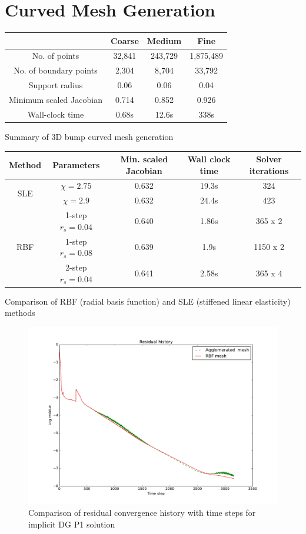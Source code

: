 \documentclass[12pt, letterpaper]{article}
\begin{document}
\section*{Curved Mesh Generation}

	\begin{tabular}{|c|c|c|c|}
		\hline
		& Coarse & Medium & Fine \\
		\hline
		No. of points 				& 32,841 & 243,729	& 1,875,489 \\
		No. of boundary points		& 2,304	& 8,704		& 33,792 \\
		Support radius				& 0.06	& 0.06		& 0.04 \\
		Minimum scaled Jacobian	& 0.714	& 0.852		& 0.926 \\
		Wall-clock time			& 0.68s	& 12.6s		& 338s \\
		\hline
	\end{tabular}
	
	Summary of 3D bump curved mesh generation
	\vspace{0.5in}

	\begin{tabular}{|c|c|c|c|c|}
		\hline
		Method & Parameters & Min. scaled Jacobian & Wall clock time & Solver iterations \\
		\hline
		\multirow{2}{0.5in}{SLE} & $\chi=2.75$ & 0.632 & 19.3s & 324 \\
		& $\chi=2.9$ & 0.632 & 24.4s & 423 \\
		\multirow{3}{0.5in}{RBF} & 1-step $r_s=0.04$ & 0.640 & 1.86s & 365 x 2 \\
		&   1-step $r_s=0.08$ & 0.639 & 1.9s & 1150 x 2\\
		&   2-step $r_s=0.04$ & 0.641 & 2.58s & 365 x 4\\
		\hline
	\end{tabular}
	
	Comparison of RBF (radial basis function) and SLE (stiffened linear elasticity) methods

\begin{figure}[!h]
	\flushleft
	\includegraphics[scale=0.6]{solver-convergence}
	\caption{Comparison of residual convergence history with time steps for implicit DG P1 solution}
\end{figure}
\end{document}
